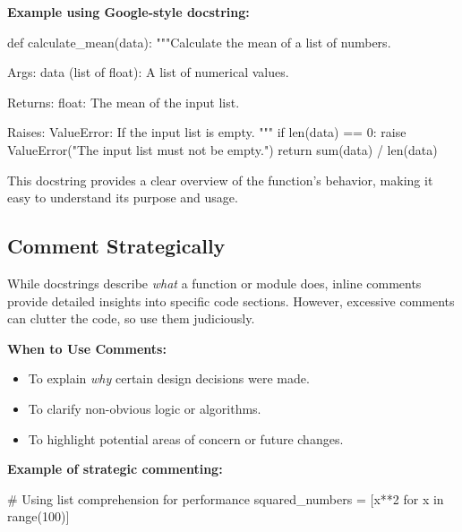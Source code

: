 \documentclass[
  letterpaper,
  DIV=11,
  numbers=noendperiod]{scrreprt}
\newenvironment{Shaded}{\begin{snugshade}}{\end{snugshade}}
\newcommand{\BuiltInTok}[1]{\textcolor[rgb]{0.00,0.23,0.31}{#1}}
\newcommand{\CommentTok}[1]{\textcolor[rgb]{0.37,0.37,0.37}{#1}}
\newcommand{\ControlFlowTok}[1]{\textcolor[rgb]{0.00,0.23,0.31}{#1}}
\newcommand{\DecValTok}[1]{\textcolor[rgb]{0.68,0.00,0.00}{#1}}
\newcommand{\KeywordTok}[1]{\textcolor[rgb]{0.00,0.23,0.31}{#1}}
\newcommand{\NormalTok}[1]{\textcolor[rgb]{0.00,0.23,0.31}{#1}}
\newcommand{\OperatorTok}[1]{\textcolor[rgb]{0.37,0.37,0.37}{#1}}
\newcommand{\PreprocessorTok}[1]{\textcolor[rgb]{0.68,0.00,0.00}{#1}}
\newcommand{\StringTok}[1]{\textcolor[rgb]{0.13,0.47,0.30}{#1}}
\providecommand{\tightlist}{%
  \setlength{\itemsep}{0pt}\setlength{\parskip}{0pt}}\usepackage{longtable,booktabs,array}
\begin{document}
\textbf{Example using Google-style docstring:}

\begin{Shaded}
\begin{Highlighting}[]
\KeywordTok{def}\NormalTok{ calculate\_mean(data):}
    \CommentTok{"""Calculate the mean of a list of numbers.}

\CommentTok{    Args:}
\CommentTok{        data (list of float): A list of numerical values.}

\CommentTok{    Returns:}
\CommentTok{        float: The mean of the input list.}

\CommentTok{    Raises:}
\CommentTok{        ValueError: If the input list is empty.}
\CommentTok{    """}
    \ControlFlowTok{if} \BuiltInTok{len}\NormalTok{(data) }\OperatorTok{==} \DecValTok{0}\NormalTok{:}
        \ControlFlowTok{raise} \PreprocessorTok{ValueError}\NormalTok{(}\StringTok{"The input list must not be empty."}\NormalTok{)}
    \ControlFlowTok{return} \BuiltInTok{sum}\NormalTok{(data) }\OperatorTok{/} \BuiltInTok{len}\NormalTok{(data)}
\end{Highlighting}
\end{Shaded}

This docstring provides a clear overview of the function's behavior,
making it easy to understand its purpose and usage.

\hypertarget{comment-strategically}{%
\subsection{Comment Strategically}\label{comment-strategically}}

While docstrings describe \emph{what} a function or module does, inline
comments provide detailed insights into specific code sections. However,
excessive comments can clutter the code, so use them judiciously.

\textbf{When to Use Comments:}

\begin{itemize}
\tightlist
\item
  To explain \emph{why} certain design decisions were made.
\item
  To clarify non-obvious logic or algorithms.
\item
  To highlight potential areas of concern or future changes.
\end{itemize}

\textbf{Example of strategic commenting:}

\begin{Shaded}
\begin{Highlighting}[]
\CommentTok{\# Using list comprehension for performance}
\NormalTok{squared\_numbers }\OperatorTok{=}\NormalTok{ [x}\OperatorTok{**}\DecValTok{2} \ControlFlowTok{for}\NormalTok{ x }\KeywordTok{in} \BuiltInTok{range}\NormalTok{(}\DecValTok{100}\NormalTok{)]}
\end{Highlighting}
\end{Shaded}
\end{document}
